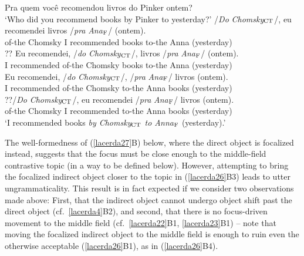 \documentclass[output=paper]{langscibook}
\begin{document}
\begin{exe}
\ex \label{lacerda26}
\begin{xlist}
 \label{lacerda26A}
Pra quem você recomendou livros do Pinker ontem?\\
‘Who did you recommend books by Pinker to yesterday?’
 \label{lacerda26B1}
\gll /\emph{Do} 	\emph{Chomsky}$_{\textnormal{CT}}$/, 	eu 	recomendei 	livros 	/\emph{pra} 	\emph{Ana}$_{\textnormal{F}}$/	(ontem).\\
of-the 	Chomsky 	I 	recommended 	books 	to-the 	Anna	(yesterday)\\

 \label{lacerda26B2}
\gll ?? Eu 	recomendei, 	/\emph{do} 	\emph{Chomsky}$_{\textnormal{CT}}$/, 	livros 	/\emph{pra} 	\emph{Ana}$_{\textnormal{F}}$/ 	(ontem).\\
{} I 	recommended 	of-the 	Chomsky 	books 	to-the 	Anna	(yesterday)\\

 \label{lacerda26B3}
\gll * Eu 	recomendei, 	/\emph{do} 	\emph{Chomsky}$_{\textnormal{CT}}$/, 	/\emph{pra} \emph{Ana}$_{\textnormal{F}}$/	livros	(ontem).\\
{} I 	recommended 	of-the 	Chomsky 	to-the 	Anna 	books	(yesterday)\\


 \label{lacerda26B4}
\gll ??/\emph{Do} 	\emph{Chomsky}$_{\textnormal{CT}}$/, 	eu 	recomendei 	/\emph{pra} \emph{Ana}$_{\textnormal{F}}$/ 	livros 	(ontem).\\
of-the 	Chomsky 	I 	recommended 	to-the 	Anna 	books 	(yesterday)\\
\glt‘I recommended books \emph{by Chomsky$_{\textnormal{CT}}$ to Anna$_{\textnormal{F}}$} (yesterday).’
\end{xlist}
\end{exe}

The well-formedness of (\ref{lacerda27}B) below, where the direct object is focalized instead, suggests that the focus must be close enough to the middle-field contrastive topic (in a way to be defined below). However, attempting to bring the focalized indirect object closer to the topic in (\ref{lacerda26}B3) leads to utter ungrammaticality. This result is in fact expected if we consider two observations made above: First, that the indirect object cannot undergo object shift past the direct object (cf.~\ref{lacerda4}B2), and second, that there is no focus-driven movement to the middle field (cf.~\ref{lacerda22}B1, \ref{lacerda23}B1) -- note that moving the focalized indirect object to the middle field is enough to ruin even the otherwise acceptable (\ref{lacerda26}B1), as in (\ref{lacerda26}B4).
\end{document}
